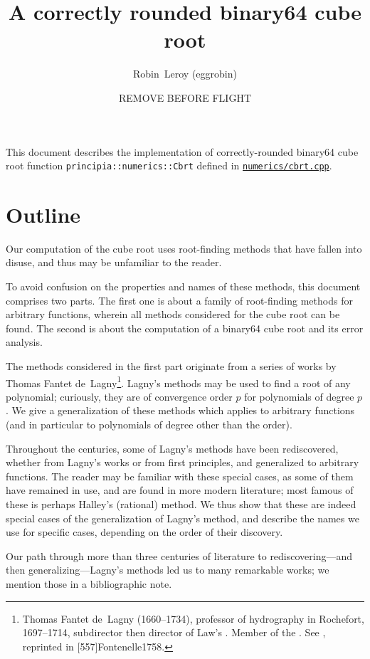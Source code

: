 ﻿\documentclass[10pt, a4paper, twoside]{basestyle}
\title{A correctly rounded binary64 cube root}
\date{REMOVE BEFORE FLIGHT \printdate{2021-04-36}}
\author{Robin~Leroy (eggrobin)}
\begin{document}
\maketitle
\noindent
This document describes the implementation of correctly-rounded binary64 cube root function {\texttt{principia::numerics::Cbrt}}
defined in \href{https://github.com/mockingbirdnest/Principia/blob/master/numerics/cbrt.cpp}{\texttt{numerics/cbrt.cpp}}.

\part*{Outline}

Our computation of the cube root uses root-finding methods that have fallen into disuse, and thus may be unfamiliar to the reader.

\cbstart{}To avoid\cbend{} confusion on the properties and names of these methods, this document comprises two parts.
The first one is about a family of root-finding methods for arbitrary functions, wherein all methods
considered for the cube root can be found. The second is about the computation of a binary64 cube root and its error
analysis.

The methods considered in the first part originate from a series of works by Thomas Fantet de~Lagny\footnote{Thomas Fantet de~Lagny (1660--1734), professor
of hydrography in Rochefort, 1697--1714, subdirector then director of Law's .
Member of the . See \cite{Fontenelle1734}, reprinted in [557\psqq]{Fontenelle1758}.}. Lagny's methods
may be used to find a root of any polynomial; curiously, they are of convergence order $p$ for polynomials of degree $p$.
We give a generalization of these methods which applies to arbitrary functions (and in particular to polynomials
of degree other than the order).

Throughout the centuries, some of Lagny's methods have been rediscovered, whether from Lagny's works or from first principles,
and generalized to arbitrary functions. The reader may be familiar with these special cases, as some of them have remained in
use, and are found in more modern literature; most famous of these is perhaps Halley's (rational) method. We thus show that
these are indeed special cases of the generalization of Lagny's method, and describe the names we use for specific cases,
depending on the order of their discovery.

Our path through more than three centuries of literature to rediscovering---and then generalizing---Lagny's methods led us to
many remarkable works; we mention those in a bibliographic note.
\end{document}
